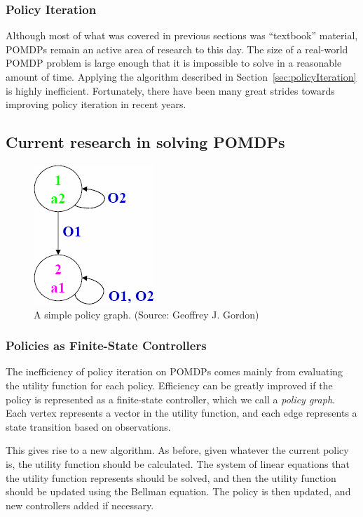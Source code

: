 \documentclass[tog]{acmsiggraph}
\begin{document}
\subsubsection{Policy Iteration}
Although most of what was covered in previous sections was ``textbook'' material, POMDPs remain 
an active area of research to this day. The size of a real-world POMDP problem is large enough 
that it is impossible to solve in a reasonable amount of time. Applying the algorithm described 
in Section~\ref{sec:policyIteration} is highly inefficient. Fortunately, there have been many 
great strides towards improving policy iteration in recent years.

\subsection{Current research in solving POMDPs}

\begin{figure}[h]
  \centering
  \includegraphics[scale=0.5]{state_controller.png}
  \caption{A simple policy graph. (Source: Geoffrey J. Gordon)}
  \label{fig:state_controller}
\end{figure}
\subsubsection{Policies as Finite-State Controllers}
The inefficiency of policy iteration on POMDPs comes mainly from evaluating the utility 
function for each policy. Efficiency can be greatly improved if the policy is represented 
as a finite-state controller, which we call a \textit{policy graph}.~\cite{hansen1998solving} 
Each vertex represents a vector in the utility function, and each edge represents a state 
transition based on observations.

This gives rise to a new algorithm. As before, given whatever the current policy is, the 
utility function should be calculated. The system of linear equations that the utility function 
represents should be solved, and then the utility function should be updated using the Bellman 
equation. The policy is then updated, and new controllers added if necessary.
\end{document}
